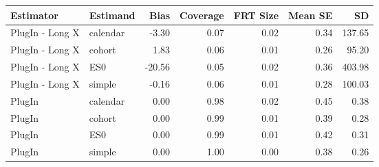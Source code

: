 \captionsetup[table]{labelformat=empty,skip=1pt}
\begin{longtable}{llrrrrr}
\toprule
Estimator & Estimand & Bias & Coverage & FRT Size & Mean SE & SD \\ 
\midrule
PlugIn - Long X & calendar & -3.30 & 0.07 & 0.02 & 0.34 & 137.65 \\ 
PlugIn - Long X & cohort & 1.83 & 0.06 & 0.01 & 0.26 & 95.20 \\ 
PlugIn - Long X & ES0 & -20.56 & 0.05 & 0.02 & 0.36 & 403.98 \\ 
PlugIn - Long X & simple & -0.16 & 0.06 & 0.01 & 0.28 & 100.03 \\ 
PlugIn & calendar & 0.00 & 0.98 & 0.02 & 0.45 & 0.38 \\ 
PlugIn & cohort & 0.00 & 0.99 & 0.01 & 0.39 & 0.28 \\ 
PlugIn & ES0 & 0.00 & 0.99 & 0.01 & 0.42 & 0.31 \\ 
PlugIn & simple & 0.00 & 1.00 & 0.00 & 0.38 & 0.26 \\ 
 \bottomrule
\end{longtable}

